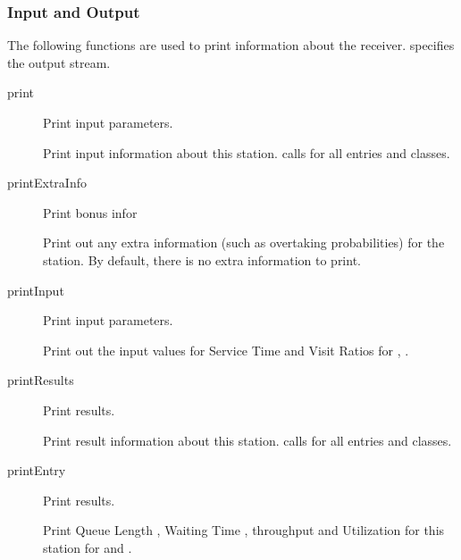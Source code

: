 \subsubsection{Input and Output}
\label{sec:server-print}

The following functions are used to print information about the
receiver.   specifies the output stream.

\begin{description}
\item[print] \texonly{---} Print input parameters.\\

  Print input information about this station.   calls
   for all entries and classes.

\item[printExtraInfo] \texonly{---} Print bonus infor\\

  Print out any extra information (such as overtaking probabilities) for
  the station.  By default, there is no extra information to print.

\item[printInput] \texonly{---} Print input parameters.\\

  Print out the input values for Service Time
   and Visit Ratios
   for  ,
   . 

\item[printResults] \texonly{---} Print results.\\

  Print result information about this station.   calls
   for all entries and classes.

\item[printEntry] \texonly{---} Print results.\\

  Print Queue Length , Waiting Time
  , throughput and Utilization
   for this station for 
   and  .
\end{description}

